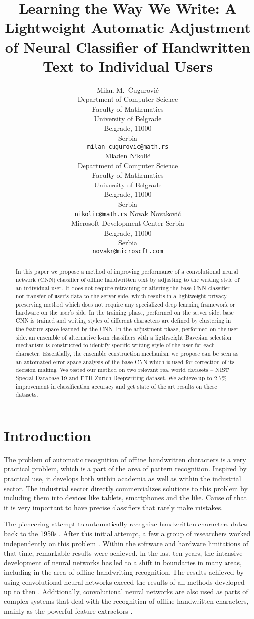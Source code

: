 \documentclass{article}
\title{Learning the Way We Write: A Lightweight Automatic Adjustment of %
Neural Classifier of Handwritten Text to Individual Users}
\author{%
  Milan M.~Čugurović\\
  Department of Computer Science\\
  Faculty of Mathematics\\
  University of Belgrade\\
  Belgrade, 11000\\
  Serbia\\
  \texttt{milan\_cugurovic@math.rs} \\
  \And
  Mladen Nikolić\\
  Department of Computer Science\\
  Faculty of Mathematics\\
  University of Belgrade\\
  Belgrade, 11000\\
  Serbia\\
  \texttt{nikolic@math.rs}
  \And
  Novak Novaković \\
  Microsoft Development Center Serbia\\
  Belgrade, 11000\\
  Serbia\\
  \texttt{novakn@microsoft.com}
}
\begin{document}
\maketitle

\begin{abstract}
  In this paper we propose a method of improving performance of a convolutional neural network (CNN) classifier of offline handwritten text by adjusting to the writing style of an individual user. It does not require retraining or altering the base CNN classifier nor transfer of user's data to the server side, which results in a lightweight privacy preserving method which does not require any specialized deep learning framework or hardware on the user's side. In the training phase, performed on the server side, base CNN is trained and writing styles of different characters are defined by clustering in the feature space learned by the CNN. In the adjustment phase, performed on the user side, an ensemble of alternative k-nn classifiers with a ligthweight Bayesian selection mechanism is constructed to identify specific writing style of the user for each character. Essentially, the ensemble construction mechanism we propose can be seen as an automated error-space analysis of the base CNN which is used for correction of its decision making.
  We tested our method on two relevant real-world datasets -- NIST Special Database 19 and ETH Zurich Deepwriting dataset. We achieve up to 2.7\% improvement in classification accuracy and get state of the art results on these datasets.
\end{abstract}

\section{Introduction}
The problem of automatic recognition of offline handwritten characters is a very practical problem, which is a part of the area of pattern recognition.
Inspired by practical use, it develops both within academia as well as within the industrial sector.
The industrial sector directly commercializes solutions to this problem by including them into devices like tablets, smartphones and the like.
Cause of that it is very important to have precise classifiers that rarely make mistakes.

The pioneering attempt to automatically recognize handwritten characters dates back to the 1950s \citet{leedham}.
After this initial attempt, a few a group of researchers worked independently on this problem \citet{plamondon}.
Within the software and hardware limitations of that time, remarkable results were achieved.
In the last ten years, the intensive development of neural networks has led to a shift in boundaries in many areas,
including in the area of offline handwriting recognition.
The results achieved by using convolutional neural networks exceed the results of all methods developed up to then \citet{cnnbest1} \citet{cnnbest2} \citet{cnnbest3}.
Additionally, convolutional neural networks are also used as parts of complex systems that deal with the recognition of offline handwritten characters,
mainly as the powerful feature extractors \citet{cnnrelated1} \citet{cnnrelated2} \citet{cnnrelated3}.
\end{document}
